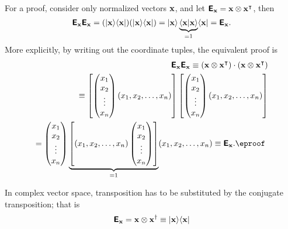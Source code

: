 {\color{OliveGreen}
\bproof
For a proof, consider only normalized vectors ${\bf x}$, and
let $\textsf{\textbf{E}}_{\bf x} = {\bf x}\otimes {\bf x}^\intercal  $,
then
$$
\textsf{\textbf{E}}_{\bf x}\textsf{\textbf{E}}_{\bf x}
=
(\vert{\bf x}\rangle \langle {\bf x}\vert)
(\vert{\bf x}\rangle \langle {\bf x}\vert)
=
\vert{\bf x}\rangle \underbrace{\langle {\bf x}\vert {\bf x}\rangle}_{=1} \langle {\bf x}\vert
=  \textsf{\textbf{E}}_{\bf x}.
$$
More explicitly, by writing out the coordinate tuples, the equivalent proof is
\begin{equation}
\begin{split}
\textsf{\textbf{E}}_{\bf x}\textsf{\textbf{E}}_{\bf x}
\equiv ({\bf x}\otimes {\bf x}^\intercal  ) \cdot ({\bf x}\otimes {\bf x}^\intercal  )
\\
\equiv
\left[
\begin{pmatrix}
x_1\\
x_2\\
\vdots \\
x_n
\end{pmatrix}
(x_1,x_2,\ldots ,x_n)
\right]
\left[
\begin{pmatrix}
x_1\\
x_2\\
\vdots \\
x_n
\end{pmatrix}
(x_1,x_2,\ldots ,x_n)
 \right]
\\
=
\begin{pmatrix}
x_1\\
x_2\\
\vdots \\
x_n
\end{pmatrix}
\underbrace{\left[ (x_1,x_2,\ldots ,x_n)
\begin{pmatrix}
x_1\\
x_2\\
\vdots \\
x_n
\end{pmatrix}
\right]}_{=1}
(x_1,x_2,\ldots ,x_n)
\equiv\textsf{\textbf{E}}_{\bf x}. \textrm{\eproof }
\end{split}
\end{equation}
}

In complex vector space, transposition has to be substituted by the conjugate transposition;
that is
\begin{equation}
\begin{split}
\textsf{\textbf{E}}_{\bf x} = {\bf x} \otimes {\bf x}^\dagger \equiv \vert{\bf x}\rangle \langle {\bf x}\vert
\end{split}
\end{equation}

